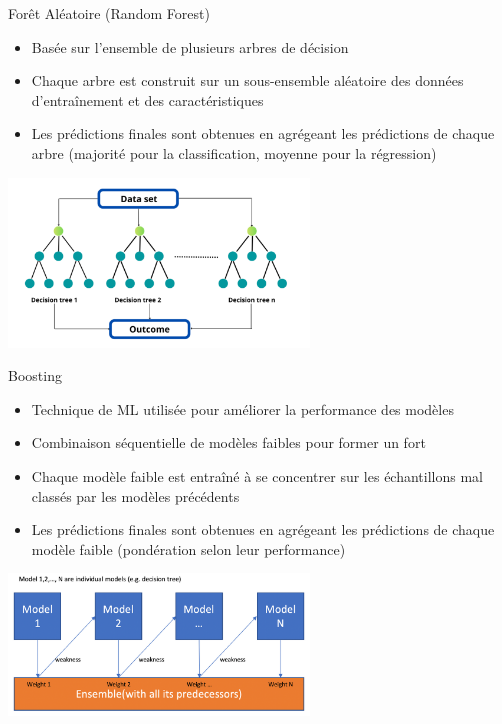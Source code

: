 \documentclass{beamer}
\begin{document}
\begin{frame}{Forêt Aléatoire (Random Forest)}
	\begin{itemize}
		\item Basée sur l'ensemble de plusieurs arbres de décision
		\item Chaque arbre est construit sur un sous-ensemble aléatoire des données d'entraînement et des caractéristiques
		\item Les prédictions finales sont obtenues en agrégeant les prédictions de chaque arbre (majorité pour la classification, moyenne pour la régression)
	\end{itemize}
	
	\begin{center}
		\includegraphics[width=0.6\textwidth]{destree.png}
	\end{center}
\end{frame}

\begin{frame}{Boosting}
	\begin{itemize}
		\item Technique de ML utilisée pour améliorer la performance des modèles
		\item Combinaison \color{blue} séquentielle \color{black}
		de modèles faibles pour former un fort
		\item Chaque modèle faible est entraîné à se concentrer sur les échantillons mal classés par les modèles précédents
		\item Les prédictions finales sont obtenues en agrégeant les prédictions de chaque modèle faible (pondération selon leur performance)
	\end{itemize}
	
	\begin{center}
		\includegraphics[width=0.6\textwidth]{boosting.png}
	\end{center}
\end{frame}
\end{document}
